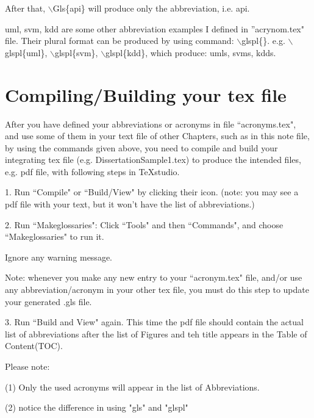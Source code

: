 After that, $\backslash$Gls\{api\} will produce only the abbreviation, i.e. \gls{api}.

\gls{uml}, \gls{svm}, \gls{kdd} are some other abbreviation examples I defined in ''acrynom.tex" file. Their plural format can be produced by using command: $\backslash$glspl\{\}.
 e.g.  $\backslash$glspl\{uml\}, $\backslash$glspl\{svm\},  $\backslash$glspl\{kdd\}, which produce:   
    \glspl{uml}, \glspl{svm}, \glspl{kdd}.  


\section{Compiling/Building your tex file}

After you have defined your abbreviations or acronyms in file ``acronyms.tex", and use some of them in your text file of other Chapters, such as in this note file, by using the commands given above, you need to compile and build your integrating tex file (e.g. DissertationSample1.tex) to produce the intended files, e.g. pdf file, with following steps in TeXstudio. 

1. Run ``Compile" or ``Build/View" by clicking their icon.
(note: you may see a pdf file with your text, but it won't have the list of abbreviations.)

2. Run ``Makeglossaries": 
Click ``Tools" and then ``Commands", and choose ``Makeglossaries" to run it. 

Ignore any warning message.

Note: whenever you make any new entry to your ``acronym.tex" file, and/or use any abbreviation/acronym in your other tex file, you must do this step to update your generated .gls file.   

3. Run ``Build and View" again. 
This time the pdf file should contain the actual list of abbreviations after the list of Figures and teh title appears in the Table of Content(TOC).
          

Please note:

(1) Only the used acronyms will appear in the list of Abbreviations.

(2) notice the difference in using "gls{}" and "glspl{}" 



